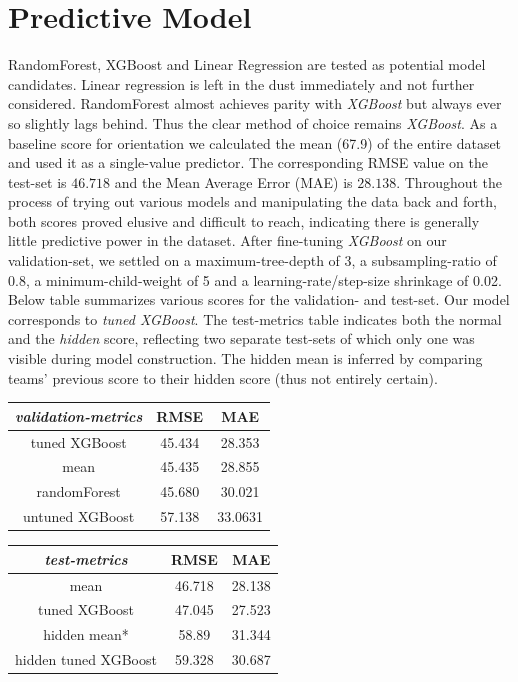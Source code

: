 \documentclass[11pt, oneside]{article}   	%
\begin{document}
\section{Predictive Model}
RandomForest, XGBoost and Linear Regression are tested as potential model candidates. Linear regression is left in the dust immediately and not further considered. RandomForest almost achieves parity with \textit{XGBoost} but always ever so slightly lags behind. Thus the clear method of choice remains \textit{XGBoost}.
\newline
\indent As a baseline score for orientation we calculated the mean (67.9) of the entire dataset and used it as a single-value predictor. The corresponding RMSE value on the test-set is $46.718$ and the Mean Average Error (MAE) is $28.138$. Throughout the process of trying out various models and manipulating the data back and forth, both scores proved elusive and difficult to reach, indicating there is generally little predictive power in the dataset. \newline
After fine-tuning \textit{XGBoost} on our validation-set, we settled on a maximum-tree-depth of 3, a subsampling-ratio of 0.8, a minimum-child-weight of 5 and a learning-rate/step-size shrinkage of 0.02.\newline
\indent Below table summarizes various scores for the validation- and test-set. Our model corresponds to \textit{tuned XGBoost}.
The test-metrics table indicates both the normal and the \textit{hidden} score, reflecting two separate test-sets of which only one was visible during model construction. The hidden mean is inferred by comparing teams' previous score to their hidden score (thus not entirely certain).
\newline
\begin{center}
\begin{tabular}{c | c c}
\textit{validation-metrics}&RMSE&MAE \\
\hline
tuned XGBoost&45.434&28.353\\
mean&45.435&28.855\\
randomForest&45.680&30.021\\
untuned XGBoost&57.138&33.0631
\end{tabular}
\end{center}

\begin{center}
\begin{tabular}{c | c c}
\textit{test-metrics}&RMSE&MAE \\
\hline
mean&46.718&28.138\\
tuned XGBoost&47.045&27.523\\
hidden mean*&58.89&31.344\\
hidden tuned XGBoost&59.328&30.687
\end{tabular}
\end{center}
\end{document}
